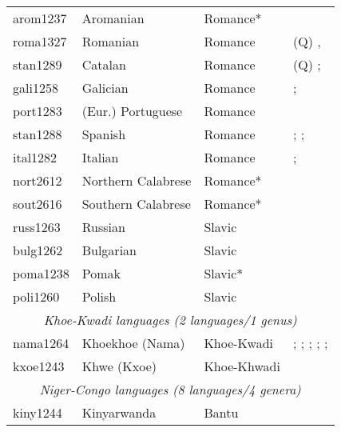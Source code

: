 \documentclass[A4paper]{article}
\begin{document}
\begin{longtable}{p{.11\linewidth}p{.2\linewidth}p{.24\linewidth}p{.35\linewidth}}
arom1237	& Aromanian 		& Romance* & \citealp[546, 560]{hoehn2015unagr}\\
roma1327	& Romanian 		& Romance & (Q) \citealp[255, 258]{mallinson1986}, \citealp[6, 10, 20f.]{cornilescunicolae2014}\\
stan1289	& Catalan 		& Romance & (Q) \citealp[287, 290]{hualde1992catalan}; \citealt[560]{hoehn2015unagr}\\
gali1258	& Galician 		& Romance & \citealp[152, 301]{alvarezetal1986}; \citealp[560]{hoehn2015unagr}\\
port1283	& (Eur.) Portuguese 	& Romance & \citealp[555, 560]{hoehn2015unagr}\\
stan1288	& Spanish 		& Romance 	& \citealp[145]{debruyne1995}; \citealp[210f.]{choi2014phd}; \citealp[560]{hoehn2015unagr} \\
ital1282	& Italian 		& Romance 	& \citealt[202f.]{cardinaletti1994}; \citealt[559]{hoehn2015unagr}\\
nort2612	& Northern Calabrese 	& Romance* & \citealp[142]{hoehnetal2016CalabrUnagr}\\
sout2616	& Southern Calabrese 	& Romance* & \citealp[142]{hoehnetal2016CalabrUnagr}\\
russ1263	& Russian 		& Slavic & \citealp[352]{pesetsky1978}\\
bulg1262	& Bulgarian 		& Slavic & \citealp[560]{hoehn2015unagr}\\
poma1238	& Pomak 		& Slavic* & \citealp[582]{papadimitriou2008}\\
poli1260	& Polish 		& Slavic & \citealp[161]{rutkowski2002}\\
\midrule
\multicolumn{4}{c}{{\emph{Khoe-Kwadi languages (2 languages/1 genus)}}}\\
\midrule
nama1264	& Khoekhoe (Nama) 	& Khoe-Kwadi 			& \citealp[133--145]{boehm1985}; \citealp{haacke1976, haacke1977, haacke2013namamorph}; \citealt[215f.]{himmelmann1997}; \citealt[142f., 311]{lyons1999}; \citealt[140]{maho1998}; \citealt[18]{rust1965}\\
kxoe1243	& Khwe (Kxoe) 		& Khoe-Khwadi 			& \citealp[40--43, 79]{kilianhatz2008}\\
\midrule
\multicolumn{4}{c}{{\emph{Niger-Congo languages (8 languages/4 genera)}}}\\
\midrule
kiny1244	& Kinyarwanda 		& Bantu 	& \citealp[68f.]{vanderwal2022}\\

\end{longtable}
\end{document}
